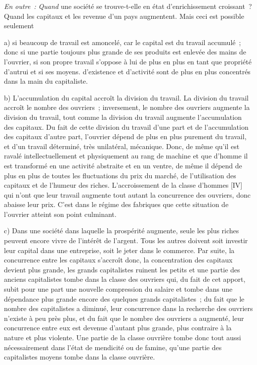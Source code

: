 \documentclass[french,twoside]{book} %
\begin{document}
\emph{En outre : Quand} une société se trouve-t-elle en état d’enrichissement croissant ? Quand les capitaux et les revenue d’un pays augmentent. Mais ceci est possible seulement\par
a) si beaucoup de travail est amoncelé, car le capital est du travail accumulé ; donc si une partie toujours plus grande de ses produits est enlevée des mains de l’ouvrier, si son propre travail s’oppose à lui de plus en plus en tant que propriété d’autrui et si ses moyens. d’existence et d’activité sont de plus en plus concentrés dans la main du capitaliste.\par
b) L’accumulation du capital accroît la division du travail. La division du travail accroît le nombre des ouvriers ; inversement, le nombre des ouvriers augmente la division du travail, tout comme la division du travail augmente l’accumulation des capitaux. Du fait de cette division du travail d’une part et de l’accumulation des capitaux d’autre part, l’ouvrier dépend de plus en plus purement du travail, et d’un travail déterminé, très unilatéral, mécanique. Donc, de même qu’il est ravalé intellectuellement et physiquement au rang de machine et que d’homme il est transformé en une activité abstraite et en un ventre, de même il dépend de plus en plus de toutes les fluctuations du prix du marché, de l’utilisation des capitaux et de l’humeur des riches. L’accroissement de la classe d’hommes [IV] qui n’ont que leur travail augmente tout autant la concurrence des ouvriers, donc abaisse leur prix. C’est dans le régime des fabriques que cette situation de l’ouvrier atteint son point culminant.\par
c) Dans une société dans laquelle la prospérité augmente, seule les plus riches peuvent encore vivre de l’intérêt de l’argent. Tous les autres doivent soit investir leur capital dans une entreprise, soit le jeter dans le commerce. Par suite, la concurrence entre les capitaux s’accroît donc, la concentration des capitaux devient plus grande, les grands capitalistes ruinent les petits et une partie des anciens capitalistes tombe dans la classe des ouvriers qui, du fait de cet apport, subit pour une part une nouvelle compression du salaire et tombe dans une dépendance plus grande encore des quelques grands capitalistes ; du fait que le nombre des capitalistes a diminué, leur concurrence dans la recherche des ouvriers n’existe à peu près plus, et du fait que le nombre des ouvriers a augmenté, leur concurrence entre eux est devenue d’autant plus grande, plus contraire à la nature et plus violente. Une partie de la classe ouvrière tombe donc tout aussi nécessairement dans l’état de mendicité ou de famine, qu’une partie des capitalistes moyens tombe dans la classe ouvrière.\par
\end{document}

